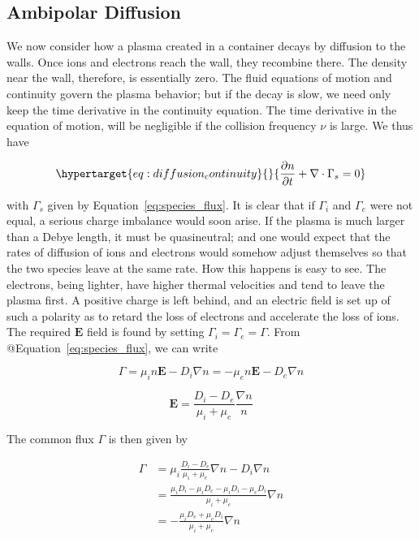 \documentclass[
  notoc %
]{tufte-book}
\begin{document}
\hypertarget{ambipolar-diffusion}{%
\subsection{Ambipolar Diffusion}\label{ambipolar-diffusion}}

We now consider how a plasma created in a container decays by diffusion
to the walls. Once ions and electrons reach the wall, they recombine
there. The density near the wall, therefore, is essentially zero. The
fluid equations of motion and continuity govern the plasma behavior; but
if the decay is slow, we need only keep the time derivative in the
continuity equation. The time derivative in the equation of motion, will
be negligible if the collision frequency \(\nu\) is large. We thus have

\begin{equation}\protect\hypertarget{eq:diffusion_continuity}{}{
\frac{\partial n}{\partial t} + \nabla\cdot\Gamma_s = 0
}\label{eq:diffusion_continuity}\end{equation}

with \(\Gamma_s\) given by Equation~\ref{eq:species_flux}. It is clear
that if \(\Gamma_i\) and \(\Gamma_e\) were not equal, a serious charge
imbalance would soon arise. If the plasma is much larger than a Debye
length, it must be quasineutral; and one would expect that the rates of
diffusion of ions and electrons would somehow adjust themselves so that
the two species leave at the same rate. How this happens is easy to see.
The electrons, being lighter, have higher thermal velocities and tend to
leave the plasma first. A positive charge is left behind, and an
electric field is set up of such a polarity as to retard the loss of
electrons and accelerate the loss of ions. The required \(\mathbf{E}\)
field is found by setting \(\Gamma_i=\Gamma_e=\Gamma\). From
@Equation~\ref{eq:species_flux}, we can write

\[
\Gamma = \mu_i n\mathbf{E} - D_i \nabla n = -\mu_e n\mathbf{E} - D_e\nabla n
\]

\[
\mathbf{E} = \frac{D_i - D_e}{\mu_i + \mu_e}\frac{\nabla n}{n}
\]

The common flux \(\Gamma\) is then given by

\[
\begin{aligned}
\Gamma &= \mu_i\frac{D_i - D_e}{\mu_i + \mu_e}\nabla n - D_i \nabla n \\
&=\frac{\mu_iD_i - \mu_iD_e - \mu_iD_i - \mu_eD_i}{\mu_i + \mu_e}\nabla n \\
&=-\frac{\mu_iD_e + \mu_eD_i}{\mu_i+\mu_e}\nabla n
\end{aligned}
\]
\end{document}

